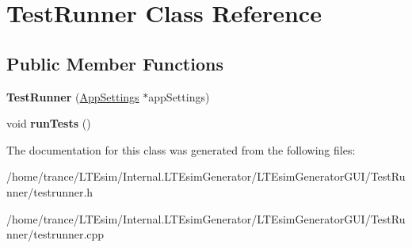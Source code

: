 \hypertarget{class_test_runner}{}\section{Test\+Runner Class Reference}
\label{class_test_runner}
\subsection*{Public Member Functions}
\begin{DoxyCompactItemize}
\item 
{\bfseries Test\+Runner} (\hyperlink{class_app_settings}{App\+Settings} $\ast$app\+Settings)\hypertarget{class_test_runner_a03b123efd12307d01685d9113a234f48}{}\label{class_test_runner_a03b123efd12307d01685d9113a234f48}

\item 
void {\bfseries run\+Tests} ()\hypertarget{class_test_runner_a50e96c6f86405de1c3a7c61b6a3f78e7}{}\label{class_test_runner_a50e96c6f86405de1c3a7c61b6a3f78e7}

\end{DoxyCompactItemize}


The documentation for this class was generated from the following files\+:\begin{DoxyCompactItemize}
\item 
/home/trance/\+L\+T\+Esim/\+Internal.\+L\+T\+Esim\+Generator/\+L\+T\+Esim\+Generator\+G\+U\+I/\+Test\+Runner/testrunner.\+h\item 
/home/trance/\+L\+T\+Esim/\+Internal.\+L\+T\+Esim\+Generator/\+L\+T\+Esim\+Generator\+G\+U\+I/\+Test\+Runner/testrunner.\+cpp\end{DoxyCompactItemize}
